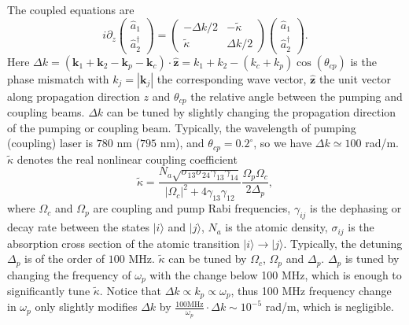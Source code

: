 \documentclass[twocolumn,prl,floatfix,citeautoscript,nofootinbib,superscriptaddress]{revtex4}
\begin{document}
\begin{widetext}
The coupled equations are
\begin{equation}
i\partial _{z}\left(
\begin{array}{c}
\hat{a}_{1} \\
\hat{a}_{2}^{\dag }%
\end{array}%
\right) =\left(
\begin{array}{cc}
-\Delta k/2 & -\tilde{\kappa} \\
\tilde{\kappa} & \Delta k/2%
\end{array}%
\right) \left(
\begin{array}{c}
\hat{a}_{1} \\
\hat{a}_{2}^{\dag }%
\end{array}%
\right) .  \label{eq:FWM}
\end{equation}%
Here $\Delta k=(\mathbf{k}_{1}+\mathbf{k}_{2}-\mathbf{k}_{p}-\mathbf{k}%
_{c})\cdot \hat{\mathbf{z}}=k_{1}+k_{2}-(k_{c}+k_{p})\cos (\theta _{cp})$ is
the phase mismatch with $k_{j}=|\mathbf{k}_{j}|$ the corresponding wave
vector, $\hat{\mathbf{z}}$ the unit vector along propagation direction $z$
and $\theta _{cp}$ the relative angle between the pumping and coupling
beams. $\Delta k$ can be tuned by slightly changing the propagation
direction of the pumping or coupling beam. Typically, the wavelength of
pumping (coupling) laser is $780$ nm ($795$ nm), and $\theta
_{cp}=0.2^{\circ }$, so we have $\Delta k\simeq 100$ rad/m. $\tilde{\kappa}$
denotes the real nonlinear coupling coefficient~\cite%
{PhysRevLett.123.193604S}
\begin{equation}
\tilde{\kappa}=\frac{N_{a}\sqrt{\sigma _{13}\sigma _{24}\gamma _{13}\gamma
_{14}}}{|\Omega _{c}|^{2}+4\gamma _{13}\gamma _{12}}\frac{\Omega _{p}\Omega
_{c}}{2\Delta _{p}},
\end{equation}%
where $\Omega _{c}$ and $\Omega _{p}$ are coupling and pump Rabi
frequencies, $\gamma _{ij}$ is the dephasing or decay rate between the
states $|i\rangle $ and $|j\rangle $, $N_{a}$ is the atomic density, $\sigma
_{ij}$ is the absorption cross section of the atomic transition $|i\rangle
\rightarrow |j\rangle $. Typically, the detuning $\Delta _{p}$ is of the
order of $100$ MHz. $\tilde{\kappa}$ can be tuned by $\Omega _{c}$, $\Omega
_{p}$ and $\Delta _{p}$. $\Delta _{p}$ is tuned by changing the frequency of
$\omega _{p}$ with the change below 100 MHz, which is enough to
significantly tune $\tilde{\kappa}$. Notice that $\Delta k\propto
k_{p}\propto \omega _{p}$, thus 100 MHz frequency change in $\omega _{p}$
only slightly modifies $\Delta k$ by $\frac{100\text{MHz}}{\omega _{p}}\cdot
\Delta k\sim 10^{-5}$ rad/m, which is negligible.


\end{widetext}
\end{document}
